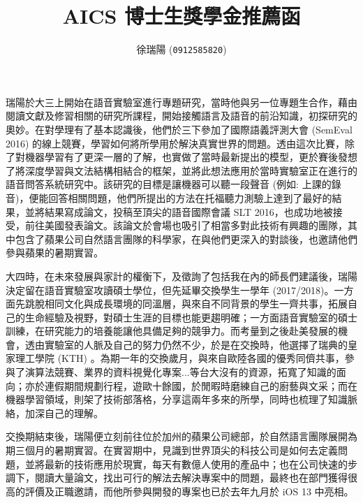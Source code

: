 \documentclass[14pt,UTF8,fntef]{memoir}
\title{AICS 博士生獎學金推薦函}
\author{徐瑞陽 (\texttt{0912585820})}
\date{}
\begin{document}
\maketitle

\vspace{-5em}

  瑞陽於大三上開始在語音實驗室進行專題研究，當時他與另一位專題生合作，藉由閱讀文獻及修習相關的研究所課程，開始接觸語言及語音的前沿知識，初探研究的奧妙。在對學理有了基本認識後，他們於三下參加了國際語義評測大會 (SemEval 2016) 的線上競賽，學習如何將所學用於解決真實世界的問題。透由這次比賽，除了對機器學習有了更深一層的了解，也實做了當時最新提出的模型，更於賽後發想了將深度學習與文法結構相結合的框架，並將此想法應用於當時實驗室正在進行的語音問答系統研究中。該研究的目標是讓機器可以聽一段聲音 (例如: 上課的錄音)，便能回答相關問題，他們所提出的方法在托福聽力測驗上達到了最好的結果，並將結果寫成論文，投稿至頂尖的語音國際會議 SLT 2016，也成功地被接受，前往美國發表論文。該論文於會場也吸引了相當多對此技術有興趣的團隊，其中包含了蘋果公司自然語言團隊的科學家，在與他們更深入的對談後，也邀請他們參與蘋果的暑期實習。

\vspace{1.5em}

大四時，在未來發展與家計的權衡下，及徵詢了包括我在內的師長們建議後，瑞陽決定留在語音實驗室攻讀碩士學位，但先延畢交換學生一學年 (2017/2018)。一方面先跳脫相同文化與成長環境的同溫層，與來自不同背景的學生一齊共事，拓展自己的生命經驗及視野，對碩士生涯的目標也能更趨明確；一方面語音實驗室的碩士訓練，在研究能力的培養能讓他具備足夠的競爭力。而考量到之後赴美發展的機會，透由實驗室的人脈及自己的努力仍然不少，於是在交換時，他選擇了瑞典的皇家理工學院 (KTH) 。為期一年的交換歲月，與來自歐陸各國的優秀同儕共事，參與了演算法競賽、業界的資料視覺化專案...等台大沒有的資源，拓寬了知識的面向；亦於連假期間規劃行程，遊歐十餘國，於閒暇時磨練自己的廚藝與文采；而在機器學習領域，則架了技術部落格，分享這兩年多來的所學，同時也梳理了知識脈絡，加深自己的理解。

\vspace{1.5em}

交換期結束後，瑞陽便立刻前往位於加州的蘋果公司總部，於自然語言團隊展開為期三個月的暑期實習。在實習期中，見識到世界頂尖的科技公司是如何去定義問題，並將最新的技術應用於現實，每天有數億人使用的產品中；也在公司快速的步調下，閱讀大量論文，找出可行的解法去解決專案中的問題，最終也在部門獲得很高的評價及正職邀請，而他所參與開發的專案也已於去年九月於 iOS 13 中亮相。

\vspace{1.5em}
\end{document}
